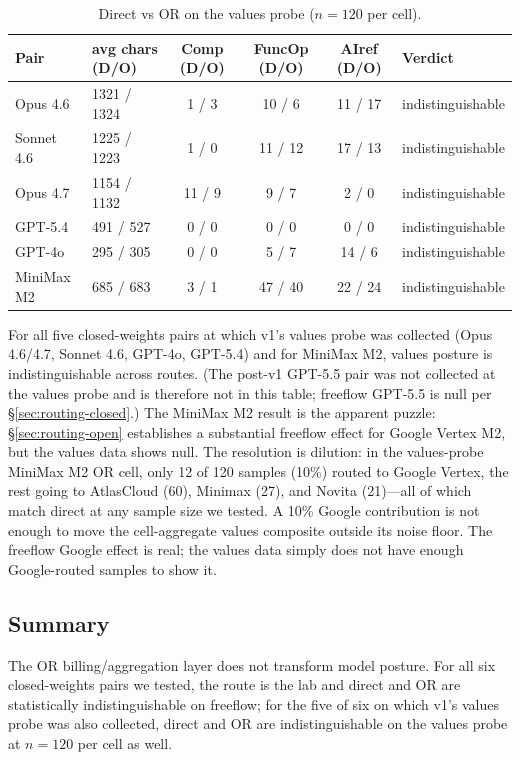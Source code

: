 \documentclass[11pt,a4paper]{article}
\begin{document}
\begin{table}[h]
\centering
\caption{Direct vs OR on the values probe ($n{=}120$ per cell).}
\label{tab:routing-values}
\footnotesize
\begin{tabular}{lp{2.1cm}cccl}
\toprule
\textbf{Pair} & \textbf{avg chars (D/O)} & \textbf{Comp (D/O)} & \textbf{FuncOp (D/O)} & \textbf{AIref (D/O)} & \textbf{Verdict} \\
\midrule
Opus 4.6 & 1321 / 1324 & 1 / 3 & 10 / 6 & 11 / 17 & indistinguishable \\
Sonnet 4.6 & 1225 / 1223 & 1 / 0 & 11 / 12 & 17 / 13 & indistinguishable \\
Opus 4.7 & 1154 / 1132 & 11 / 9 & 9 / 7 & 2 / 0 & indistinguishable \\
GPT-5.4 & 491 / 527 & 0 / 0 & 0 / 0 & 0 / 0 & indistinguishable \\
GPT-4o & 295 / 305 & 0 / 0 & 5 / 7 & 14 / 6 & indistinguishable \\
MiniMax M2 & 685 / 683 & 3 / 1 & 47 / 40 & 22 / 24 & indistinguishable \\
\bottomrule
\end{tabular}
\end{table}

For all five closed-weights pairs at which v1's values probe was collected (Opus 4.6/4.7, Sonnet 4.6, GPT-4o, GPT-5.4) and for MiniMax M2, values posture is indistinguishable across routes. (The post-v1 GPT-5.5 pair was not collected at the values probe and is therefore not in this table; freeflow GPT-5.5 is null per \S\ref{sec:routing-closed}.) The MiniMax M2 result is the apparent puzzle: \S\ref{sec:routing-open} establishes a substantial freeflow effect for Google Vertex M2, but the values data shows null. The resolution is dilution: in the values-probe MiniMax M2 OR cell, only 12 of 120 samples (10\%) routed to Google Vertex, the rest going to AtlasCloud (60), Minimax (27), and Novita (21)---all of which match direct at any sample size we tested. A 10\% Google contribution is not enough to move the cell-aggregate values composite outside its noise floor. The freeflow Google effect is real; the values data simply does not have enough Google-routed samples to show it.

\subsection{Summary}
\label{sec:routing-summary}

The OR billing/aggregation layer does not transform model posture. For all six closed-weights pairs we tested, the route is the lab and direct and OR are statistically indistinguishable on freeflow; for the five of six on which v1's values probe was also collected, direct and OR are indistinguishable on the values probe at $n{=}120$ per cell as well.
\end{document}

